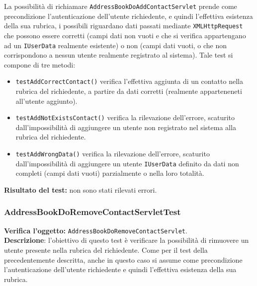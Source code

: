 La possibilità di richiamare \texttt{AddressBookDoAddContactServlet} prende come precondizione l'autenticazione dell'utente richiedente, e quindi l'effettiva esistenza della sua rubrica, i possibili  riguardano dati passati mediante \texttt{XMLHttpRequest} che possono essere corretti (campi dati non vuoti e che si verifica appartengano ad un \texttt{IUserData} realmente esistente) o non (campi dati vuoti, o che non corrispondono a nessun utente realmente registrato al sistema).
Tale test si compone di tre metodi:
\begin{itemize}
\item \texttt{testAddCorrectContact()} verifica l'effettiva aggiunta di un contatto nella rubrica del richiedente, a partire da dati corretti (realmente apparteneneti all'utente aggiunto).
\item \texttt{testAddNotExistsContact()} verifica la rilevazione dell'errore, scaturito dall'impossibilità di aggiungere un utente non registrato nel sistema alla rubrica del richiedente.
\item \texttt{testAddWrongData()} verifica la rilevazione dell'errore, scaturito dall'impossibilità di aggiungere un utente \texttt{IUserData} definito da dati non completi (campi dati vuoti) parzialmente o nella loro totalità.
\end{itemize}
\textbf{Risultato del test:} non sono stati rilevati errori.


\subsubsection{AddressBookDoRemoveContactServletTest}
\textbf{Verifica l'oggetto:} \texttt{AddressBookDoRemoveContactServlet}.\\
\textbf{Descrizione}: l'obiettivo di questo test è verificare la possibilità di rimuovere un utente presente nella rubrica del richiedente. Come per il test della  precedentemente descritta, anche in questo caso si assume come precondizione l'autenticazione dell'utente richiedente e quindi l'effettiva esistenza della sua rubrica.

